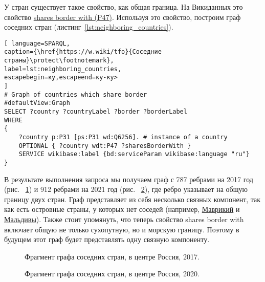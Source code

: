 У стран существует такое свойство, как общая граница. На Викиданных это свойство  \href{https://www.wikidata.org/wiki/Property:P47}{shares border with (P47)}. Используя это свойство, построим граф соседних стран (листинг~\ref{lst:neighboring_countries}).
\begin{lstlisting}[ language=SPARQL, 
caption={\href{https://w.wiki/tfo}{Соседние страны}\protect\footnotemark},
label=lst:neighboring_countries, 
escapebegin=ку,escapeend=ку-ку>
]
# Graph of countries which share border
#defaultView:Graph
SELECT ?country ?countryLabel ?border ?borderLabel
WHERE
{
	?country p:P31 [ps:P31 wd:Q6256]. # instance of a country
	OPTIONAL { ?country wdt:P47 ?sharesBorderWith }
	SERVICE wikibase:label {bd:serviceParam wikibase:language "ru"}
}
\end{lstlisting}


В результате выполнения запроса мы получаем граф с 787 ребрами на 2017 год (рис. ~\ref{fig:neighboring_countries_2017}) и 912 ребрами на 2021 год (рис. ~\ref{fig:neighboring_countries_2020}), где ребро указывает на общую границу двух стран. Граф представляет из себя несколько связных компонент, так как есть островные страны, у которых нет соседей (например, \href{https://w.wiki/vC7}{Маврикий} и \href{https://w.wiki/vC8}{Мальдивы}). Также стоит упомянуть, что теперь свойство shares border with включает общую не только сухопутную, но и морскую границу. Поэтому в будущем этот граф будет представлять одну связную компоненту. 

\begin{figure}
	{
		\setlength{\fboxsep}{0pt}%
		\setlength{\fboxrule}{1pt}%
	}
	\caption{Фрагмент графа соседних стран, в центре Россия, 2017.
	}%
	\label{fig:neighboring_countries_2017}%
\end{figure}

\begin{figure}
	{
		\setlength{\fboxsep}{0pt}%
		\setlength{\fboxrule}{1pt}%
	}
	\caption{Фрагмент графа соседних стран, в центре Россия, 2020.
	}%
	\label{fig:neighboring_countries_2020}%
\end{figure}


